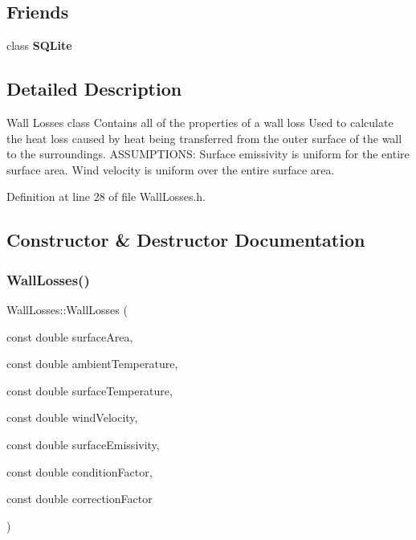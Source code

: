 \subsection*{Friends}
\begin{DoxyCompactItemize}
\item 
\mbox{\label{class_wall_losses_a0102f3b3c0cbf96db6c49f071fa5e7cc}} 
class {\bfseries S\+Q\+Lite}
\end{DoxyCompactItemize}


\subsection{Detailed Description}
Wall Losses class Contains all of the properties of a wall loss Used to calculate the heat loss caused by heat being transferred from the outer surface of the wall to the surroundings. A\+S\+S\+U\+M\+P\+T\+I\+O\+NS\+: Surface emissivity is uniform for the entire surface area. Wind velocity is uniform over the entire surface area. 

Definition at line 28 of file Wall\+Losses.\+h.



\subsection{Constructor \& Destructor Documentation}
\mbox{\label{class_wall_losses_a7d46f259c632ecdcde5ae31468c03e2e}} 
\subsubsection{\texorpdfstring{Wall\+Losses()}{WallLosses()}\hspace{0.1cm}{\footnotesize\ttfamily [1/3]}}
{\footnotesize\ttfamily Wall\+Losses\+::\+Wall\+Losses (\begin{DoxyParamCaption}\item[{const double}]{surface\+Area,  }\item[{const double}]{ambient\+Temperature,  }\item[{const double}]{surface\+Temperature,  }\item[{const double}]{wind\+Velocity,  }\item[{const double}]{surface\+Emissivity,  }\item[{const double}]{condition\+Factor,  }\item[{const double}]{correction\+Factor }\end{DoxyParamCaption})\hspace{0.3cm}{\ttfamily [inline]}}

